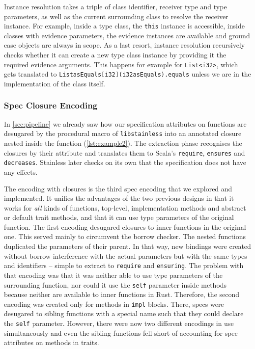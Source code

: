 Instance resolution takes a triple of class identifier, receiver type
and type parameters, as well as the current surrounding class to resolve
the receiver instance. For example, inside a type class, the
\passthrough{\lstinline!this!} instance is accessible, inside classes
with evidence parameters, the evidence instances are available and
ground case objects are always in scope. As a last resort, instance
resolution recursively checks whether it can create a new type class
instance by providing it the required evidence arguments. This happens
for example for \passthrough{\lstinline!List<i32>!}, which gets
translated to
\passthrough{\lstinline!ListasEquals[i32](i32asEquals).equals!} unless
we are in the implementation of the class itself.

\subsubsection{Spec Closure Encoding}

In \autoref{sec:pipeline} we already saw how our specification attributes
on functions are desugared by the procedural macro of
\passthrough{\lstinline!libstainless!} into an annotated closure nested
inside the function (\autoref{lst:example2}). The extraction phase
recognises the closures by their attribute and translates them to
Scala's \passthrough{\lstinline!require!},
\passthrough{\lstinline!ensures!} and
\passthrough{\lstinline!decreases!}. Stainless later checks on its own
that the specification does not have any effects.

The encoding with closures is the third spec encoding that we explored
and implemented. It unifies the advantages of the two previous designs
in that it works for \emph{all} kinds of functions, top-level,
implementation methods and abstract or default trait methods, and that
it can use type parameters of the original function. The first encoding
desugared closures to inner functions in the original one. This served
mainly to circumvent the borrow checker. The nested functions duplicated
the parameters of their parent. In that way, new bindings were created
without borrow interference with the actual parameters but with the same
types and identifiers -- simple to extract to
\passthrough{\lstinline!require!} and
\passthrough{\lstinline!ensuring!}. The problem with that encoding was
that it was neither able to use type parameters of the surrounding
function, nor could it use the \passthrough{\lstinline!self!} parameter
inside methods because neither are available to inner functions in Rust.
Therefore, the second encoding was created only for methods in
\passthrough{\lstinline!impl!} blocks. There, specs were desugared to
sibling functions with a special name such that they could declare the
\passthrough{\lstinline!self!} parameter. However, there were now two
different encodings in use simultaneously and even the sibling functions
fell short of accounting for spec attributes on methods in traits.

